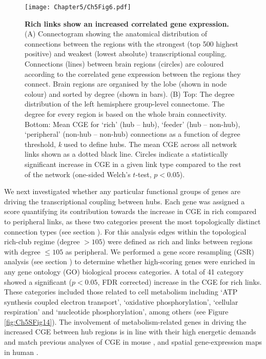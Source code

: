 \begin{figure}[h!]
\begin{center}
\texttt{[image: Chapter5/Ch5Fig6.pdf]}%
\end{center}
\caption{\textbf{Rich links show an increased correlated gene expression.}
(A) Connectogram showing the anatomical distribution of connections between the regions with the strongest (top 500 highest positive) and weakest (lowest absolute) transcriptional coupling. Connections (lines) between brain regions (circles) are coloured according to the correlated gene expression between the regions they connect. Brain regions are organised by the lobe (shown in node colour) and sorted by degree (shown in bars). 
(B) Top: The degree distribution of the left hemisphere group-level connectome. The degree for every region is based on the whole brain connectivity. Bottom: Mean CGE for `rich' (hub -- hub), `feeder' (hub -- non-hub), `peripheral' (non-hub -- non-hub) connections as a function of degree threshold, \textit{k} used to define hubs. The mean CGE across all network links shown as a dotted black line. Circles indicate a statistically significant increase in CGE in a given link type compared to the rest of the network (one-sided Welch's $t$-test, $p < 0.05$).}
\label{fig:Ch5Fig6}
\end{figure}

We next investigated whether any particular functional groups of genes are driving the transcriptional coupling between hubs. Each gene was assigned a score quantifying its contribution towards the increase in CGE in rich compared to peripheral links, as these two categories present the most topologically distinct connection types (see section ). For this analysis edges within the topological rich-club regime (degree $> 105$) were defined as rich and links between regions with degree $\leq105$ as peripheral. We performed a gene score resampling (GSR) analysis (see section ) to determine whether high-scoring genes were enriched in any gene ontology (GO) biological process categories. A total of 41 category showed a significant ($p<0.05$, FDR corrected) increase in the CGE for rich links. These categories included those related to cell metabolism including `ATP synthesis coupled electron transport', `oxidative phosphorylation', `cellular respiration' and `nucleotide phosphorylation', among others (see Figure \ref{fig:Ch5SFig14}). The involvement of metabolism-related genes in driving the increased CGE between hub regions is in line with their high energetic demands \citep{Bullmore2012,Collin2014,Liang2013a,Tomasi2013} and match previous analyses of CGE in mouse \citep{Fulcher2016}, and spatial gene-expression maps in human \citep{Vertes2016b}.

